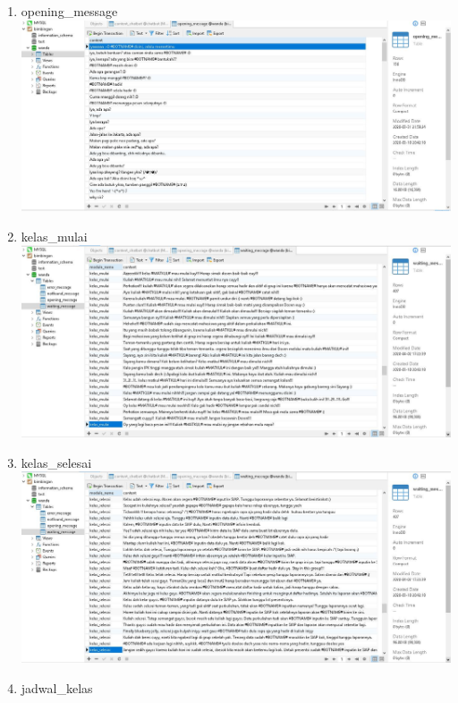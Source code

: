 \documentclass{article}
\begin{document}
    \begin{enumerate}
        \item opening\_message
            \newline
            \includegraphics[scale=0.3]{31.1.jpg}
            \newline
        \item kelas\_mulai
            \newline
            \includegraphics[scale=0.3]{31.2.jpg}
            \newline
        \item kelas\_selesai
            \newline
            \includegraphics[scale=0.3]{31.3.jpg}
            \newline
        \item jadwal\_kelas

\end{enumerate}
\end{document}
